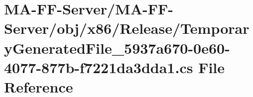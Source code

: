 \hypertarget{x86_2_release_2_temporary_generated_file__5937a670-0e60-4077-877b-f7221da3dda1_8cs}{}\section{M\+A-\/\+F\+F-\/\+Server/\+M\+A-\/\+F\+F-\/\+Server/obj/x86/\+Release/\+Temporary\+Generated\+File\+\_\+5937a670-\/0e60-\/4077-\/877b-\/f7221da3dda1.cs File Reference}
\label{x86_2_release_2_temporary_generated_file__5937a670-0e60-4077-877b-f7221da3dda1_8cs}
